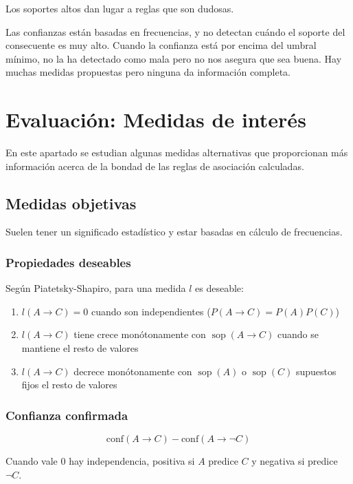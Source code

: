 \documentclass[a4paper,11pt,spanish]{report}
\let\stdsection\section
\let\stdsub\subsection
\let\stdsubsub\subsubsection
\renewcommand{\chapter}{\stdsection}
\renewcommand{\section}{\stdsub}
\renewcommand{\subsection}{\stdsubsub}
\begin{document}
Los soportes altos dan lugar a reglas que son dudosas.

Las confianzas están basadas en frecuencias, y no detectan cuándo el soporte del consecuente es muy alto. Cuando la confianza está por encima del umbral mínimo, no la ha detectado como mala pero no nos asegura que sea buena. Hay muchas medidas propuestas pero ninguna da información completa.

\chapter{Evaluación: Medidas de interés}
\label{sec-4-2}

En este apartado se estudian algunas medidas alternativas que proporcionan más información acerca de la bondad de las reglas de asociación calculadas. 

\section{Medidas objetivas}
\label{sec-4-2-1}

Suelen tener un significado estadístico y estar basadas en cálculo de frecuencias.

\subsection*{Propiedades deseables}
\label{sec-4-2-1-1}

Según Piatetsky-Shapiro, para una medida $l$ es deseable:
\begin{enumerate}
\item $l(A\rightarrow C)=0$ cuando son independientes ($P(A\rightarrow C)=P(A)P(C)$)
\item $l(A\rightarrow C)$ tiene crece monótonamente con $\operatorname{sop}(A\rightarrow C)$ cuando se mantiene el resto de valores
\item $l(A\rightarrow C)$ decrece monótonamente con $\operatorname{sop}(A)$ o $\operatorname{sop}(C)$ supuestos fijos el resto de valores
\end{enumerate}

\subsection*{Confianza confirmada}
\label{sec-4-2-1-2}

$$\text{conf}(A\rightarrow C) - \text{conf}(A\rightarrow \neg C)$$

Cuando vale 0 hay independencia, positiva si $A$ predice $C$ y negativa si predice $\neg C$.
\end{document}

